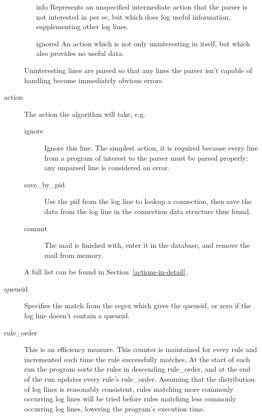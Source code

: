 \documentclass[a4paper,12pt,draft]{article}
\begin{document}
\begin{description}
        \begin{itemize}

            \item [info] Represents an unspecified intermediate action that
                the parser is not interested in per se, but which does log
                useful information, supplementing other log lines.

            \item [ignored] An action which is not only uninteresting in
                itself, but which also provides no useful data.

        \end{itemize}

        Uninteresting lines are parsed so that any lines the parser isn't
        capable of handling become immediately obvious errors.

    \item [action] The action the algorithm will take, e.g.
        \begin{description}

            \item [ignore] Ignore this line.  The simplest action, it is
                required because every line from a program of interest to
                the parser must be parsed properly; any unparsed line is
                considered an error.

            \item [save\_by\_pid] Use the pid from the log line to lookup a
                connection, then save the data from the log line in the
                connection data structure thus found.

            \item [commit] The mail is finished with, enter it in the
                database, and remove the mail from memory.

        \end{description}

        A full list can be found in Section~\ref{actions-in-detail}.

    \item [queueid] Specifies the match from the regex which gives the
        queueid, or zero if the log line doesn't contain a queueid.

    \item [rule\_order] This is an efficiency measure.  This counter is
        maintained for every rule and incremented each time the rule
        successfully matches.  At the start of each run the program sorts
        the rules in descending rule\_order, and at the end of the run
        updates every rule's rule\_order.  Assuming that the distribution
        of log lines is reasonably consistent, rules matching more commonly
        occurring log lines will be tried before rules matching less
        commonly occurring log lines, lowering the program's execution
        time.


\end{description}
\end{document}
